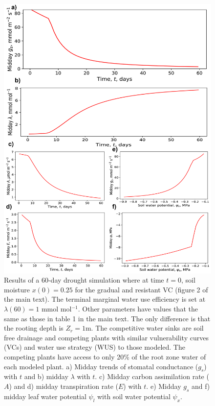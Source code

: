 \documentclass[utf8]{frontiers_suppmat} %
\begin{document}
\begin{figure}[b]
    \centering
    \includegraphics[scale=0.17]{Long_Drought_Fig.jpg}
    \caption{Results of a 60-day drought simulation where at time $t=0$, soil moisture $x(0) =0.25$ for the gradual and resistant VC (figure 2 of the main text). The terminal marginal water use efficiency is set at $\lambda(60) = 1$ mmol mol$^{-1}$. Other parameters have values that the same as those in table 1 in the main text. The only difference is that the rooting depth is $Z_r = 1$m. The competitive water sinks are soil free drainage and competing plants with similar vulnerability curves (VCs) and water use strategy (WUS) to those modeled. The competing plants have access to only 20\% of the root zone water of each modeled plant. a) Midday trends of stomatal conductance ($g_s$) with $t$ and b) midday $\lambda$ with $t$. c) Midday carbon assimilation rate ($A$) and d) midday transpiration rate ($E$) with $t$. e) Midday $g_s$ and f) midday leaf water potential $\psi_l$ with soil water potential $\psi_x$.}
    \label{fig:Drought}
\end{figure}
\end{document}
